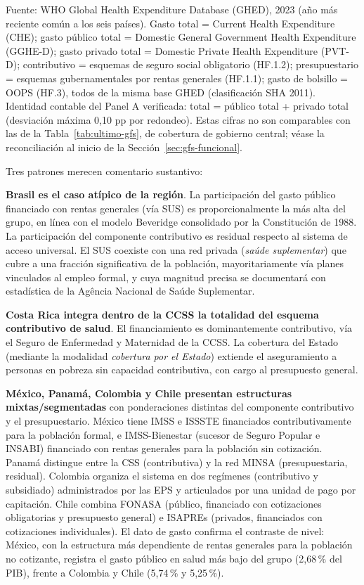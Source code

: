 \documentclass[12pt, letterpaper]{article}
\begin{document}
\begin{table}[h!]
\smallskip
\footnotesize
Fuente: WHO Global Health Expenditure Database (GHED), 2023 (año más reciente común a
los seis países). Gasto total = Current Health Expenditure (CHE); gasto público total
= Domestic General Government Health Expenditure (GGHE-D); gasto privado total =
Domestic Private Health Expenditure (PVT-D); contributivo = esquemas de seguro social
obligatorio (HF.1.2); presupuestario = esquemas gubernamentales por rentas generales
(HF.1.1); gasto de bolsillo = OOPS (HF.3), todos de la misma base GHED (clasificación
SHA 2011). Identidad contable del Panel A verificada: total = público total + privado
total (desviación máxima 0{,}10 pp por redondeo). Estas cifras no son comparables con
las de la Tabla~\ref{tab:ultimo-gfs}, de cobertura de gobierno central; véase la
reconciliación al inicio de la Sección~\ref{sec:gfs-funcional}.
\end{table}

Tres patrones merecen comentario sustantivo:

\textbf{Brasil es el caso atípico de la región}. La participación del gasto público
financiado con rentas generales (vía SUS) es proporcionalmente la más alta del
grupo, en línea con el modelo Beveridge consolidado por la Constitución de 1988.
La participación del componente contributivo es residual respecto al sistema de
acceso universal. El SUS coexiste con una red privada (\textit{saúde suplementar})
que cubre a una fracción significativa de la población, mayoritariamente vía planes
vinculados al empleo formal, y cuya magnitud precisa se documentará con estadística
de la Agência Nacional de Saúde Suplementar.

\textbf{Costa Rica integra dentro de la CCSS la totalidad del esquema contributivo
de salud}. El financiamiento es dominantemente contributivo, vía el Seguro de
Enfermedad y Maternidad de la CCSS. La cobertura del Estado (mediante la modalidad
\textit{cobertura por el Estado}) extiende el aseguramiento a personas en pobreza
sin capacidad contributiva, con cargo al presupuesto general.

\textbf{México, Panamá, Colombia y Chile presentan estructuras
mixtas/segmentadas} con ponderaciones distintas del componente contributivo y el
presupuestario. México tiene IMSS e ISSSTE financiados contributivamente para la
población formal, e IMSS-Bienestar (sucesor de Seguro Popular e INSABI) financiado
con rentas generales para la población sin cotización. Panamá distingue entre la
CSS (contributiva) y la red MINSA (presupuestaria, residual). Colombia organiza el
sistema en dos regímenes (contributivo y subsidiado) administrados por las EPS y
articulados por una unidad de pago por capitación. Chile combina FONASA (público,
financiado con cotizaciones obligatorias y presupuesto general) e ISAPREs
(privados, financiados con cotizaciones individuales). El dato de gasto confirma el
contraste de nivel: México, con la estructura más dependiente de rentas generales
para la población no cotizante, registra el gasto público en salud más bajo del
grupo (2{,}68\,\% del PIB), frente a Colombia y Chile (5{,}74\,\% y 5{,}25\,\%).
\end{document}
